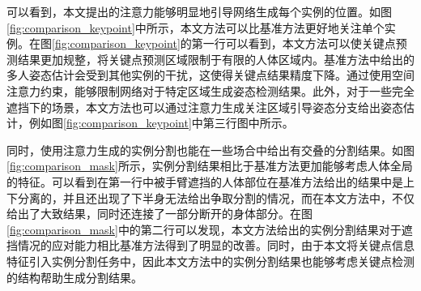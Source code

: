 可以看到，本文提出的注意力能够明显地引导网络生成每个实例的位置。如图\ref{fig:comparison_keypoint}中所示，本文方法可以比基准方法更好地关注单个实例。在图\ref{fig:comparison_keypoint}的第一行可以看到，本文方法可以使关键点预测结果更加规整，将关键点预测区域限制于有限的人体区域内。基准方法中给出的多人姿态估计会受到其他实例的干扰，这使得关键点结果精度下降。通过使用空间注意力约束，能够限制网络对于特定区域生成姿态检测结果。此外，对于一些完全遮挡下的场景，本文方法也可以通过注意力生成关注区域引导姿态分支给出姿态估计，例如图\ref{fig:comparison_keypoint}中第三行图中所示。

同时，使用注意力生成的实例分割也能在一些场合中给出有交叠的分割结果。如图\ref{fig:comparison_mask}所示，实例分割结果相比于基准方法更加能够考虑人体全局的特征。可以看到在第一行中被手臂遮挡的人体部位在基准方法给出的结果中是上下分离的，并且还出现了下半身无法给出争取分割的情况，而在本文方法中，不仅给出了大致结果，同时还连接了一部分断开的身体部分。在图\ref{fig:comparison_mask}中的第二行可以发现，本文方法给出的实例分割结果对于遮挡情况的应对能力相比基准方法得到了明显的改善。同时，由于本文将关键点信息特征引入实例分割任务中，因此本文方法中的实例分割结果也能够考虑关键点检测的结构帮助生成分割结果。

